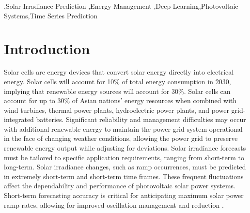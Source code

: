 \documentclass[a4paper,fleqn]{cas-sc}
\begin{document}

\begin{keywords}
\sep Solar Irradiance Prediction \sep Energy Management \sep Deep Learning\sep Photovoltaic Systems\sep Time Series Prediction

\end{keywords}
\maketitle

\section{Introduction}
Solar cells are energy devices that convert solar energy directly into electrical energy. Solar cells will account for 10\% of total energy consumption in 2030, implying that renewable energy sources will account for 30\%. Solar cells can account for up to 30\%  of Asian nations' energy resources when combined with wind turbines, thermal power plants, hydroelectric power plants, and power grid-integrated batteries. Significant reliability and management difficulties may occur with additional renewable energy to maintain the power grid system operational in the face of changing weather conditions, allowing the power grid to preserve renewable energy output while adjusting for deviations. Solar irradiance forecasts must be tailored to specific application requirements, ranging from short-term to long-term. Solar irradiance changes, such as ramp occurrences, must be predicted in extremely short-term and short-term time frames. These frequent fluctuations affect the dependability and performance of photovoltaic solar power systems. Short-term forecasting accuracy is critical for anticipating maximum solar power ramp rates, allowing for improved oscillation management and reduction \cite{brahma2020solar}.
\end{document}
